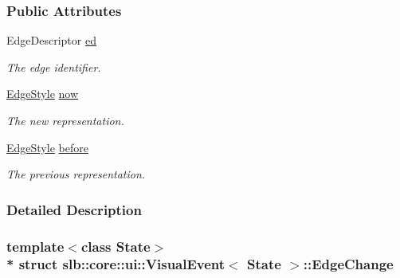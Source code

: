 \subsubsection*{Public Attributes}
\begin{DoxyCompactItemize}
\item 
Edge\+Descriptor \hyperlink{structslb_1_1core_1_1ui_1_1VisualEvent_1_1EdgeChange_a507204bfd9b20a7014d498e4c89c6d43}{ed}\hypertarget{structslb_1_1core_1_1ui_1_1VisualEvent_1_1EdgeChange_a507204bfd9b20a7014d498e4c89c6d43}{}\label{structslb_1_1core_1_1ui_1_1VisualEvent_1_1EdgeChange_a507204bfd9b20a7014d498e4c89c6d43}

\begin{DoxyCompactList}\small\item\em The edge identifier. \end{DoxyCompactList}\item 
\hyperlink{structslb_1_1core_1_1ui_1_1VisualEvent_ac004f17adad03549e2d7b07302e9c154}{Edge\+Style} \hyperlink{structslb_1_1core_1_1ui_1_1VisualEvent_1_1EdgeChange_a54f50a528016a4321b43dd9ffeb50edf}{now}\hypertarget{structslb_1_1core_1_1ui_1_1VisualEvent_1_1EdgeChange_a54f50a528016a4321b43dd9ffeb50edf}{}\label{structslb_1_1core_1_1ui_1_1VisualEvent_1_1EdgeChange_a54f50a528016a4321b43dd9ffeb50edf}

\begin{DoxyCompactList}\small\item\em The new representation. \end{DoxyCompactList}\item 
\hyperlink{structslb_1_1core_1_1ui_1_1VisualEvent_ac004f17adad03549e2d7b07302e9c154}{Edge\+Style} \hyperlink{structslb_1_1core_1_1ui_1_1VisualEvent_1_1EdgeChange_a9eb931a962fc08d955573df5a54b6e6a}{before}\hypertarget{structslb_1_1core_1_1ui_1_1VisualEvent_1_1EdgeChange_a9eb931a962fc08d955573df5a54b6e6a}{}\label{structslb_1_1core_1_1ui_1_1VisualEvent_1_1EdgeChange_a9eb931a962fc08d955573df5a54b6e6a}

\begin{DoxyCompactList}\small\item\em The previous representation. \end{DoxyCompactList}\end{DoxyCompactItemize}


\subsubsection{Detailed Description}
\subsubsection*{template$<$class State$>$\\*
struct slb\+::core\+::ui\+::\+Visual\+Event$<$ State $>$\+::\+Edge\+Change}

